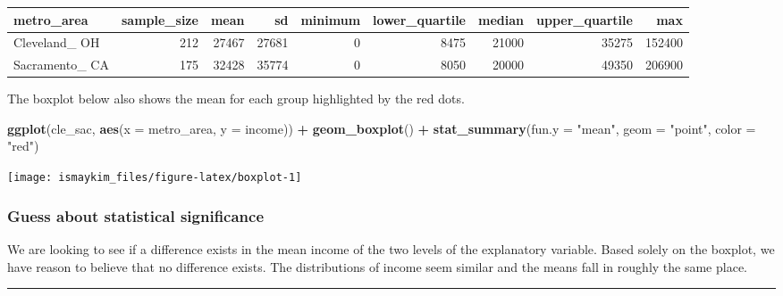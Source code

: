 \documentclass[12pt,]{krantz}
\makeatletter
\newenvironment{Shaded}{\begin{snugshade}}{\end{snugshade}}
\newcommand{\KeywordTok}[1]{\textcolor[rgb]{0.27,0.27,0.27}{\textbf{#1}}}
\newcommand{\DataTypeTok}[1]{\textcolor[rgb]{0.27,0.27,0.27}{#1}}
\newcommand{\StringTok}[1]{\textcolor[rgb]{0.5,0.5,0.5}{#1}}
\newcommand{\OperatorTok}[1]{\textcolor[rgb]{0.43,0.43,0.43}{\textbf{#1}}}
\newcommand{\NormalTok}[1]{#1}
\newenvironment{kframe}{%
\medskip{}
\setlength{\fboxsep}{.8em}
 \def\at@end@of@kframe{}%
 \ifinner\ifhmode%
  \def\at@end@of@kframe{\end{minipage}}%
  \begin{minipage}{\columnwidth}%
 \fi\fi%
 \def\FrameCommand##1{\hskip\@totalleftmargin \hskip-\fboxsep
 \colorbox{shadecolor}{##1}\hskip-\fboxsep
     \hskip-\linewidth \hskip-\@totalleftmargin \hskip\columnwidth}%
 \MakeFramed {\advance\hsize-\width
   \@totalleftmargin\z@ \linewidth\hsize
   \@setminipage}}%
 {\par\unskip\endMakeFramed%
 \at@end@of@kframe}
\renewenvironment{Shaded}{\begin{kframe}}{\end{kframe}}
\theoremstyle{definition}
\theoremstyle{definition}
\theoremstyle{definition}
\theoremstyle{remark}
\makeatother
\begin{document}
\begin{table}[H]
\centering\begingroup\fontsize{10}{12}\selectfont

\begin{tabular}{l|r|r|r|r|r|r|r|r}
\hline
metro\_area & sample\_size & mean & sd & minimum & lower\_quartile & median & upper\_quartile & max\\
\hline
Cleveland\_ OH & 212 & 27467 & 27681 & 0 & 8475 & 21000 & 35275 & 152400\\
\hline
Sacramento\_ CA & 175 & 32428 & 35774 & 0 & 8050 & 20000 & 49350 & 206900\\
\hline
\end{tabular}\endgroup{}
\end{table}

The boxplot below also shows the mean for each group highlighted by the
red dots.

\begin{Shaded}
\begin{Highlighting}[]
\KeywordTok{ggplot}\NormalTok{(cle_sac, }\KeywordTok{aes}\NormalTok{(}\DataTypeTok{x =}\NormalTok{ metro_area, }\DataTypeTok{y =}\NormalTok{ income)) }\OperatorTok{+}
\StringTok{  }\KeywordTok{geom_boxplot}\NormalTok{() }\OperatorTok{+}
\StringTok{  }\KeywordTok{stat_summary}\NormalTok{(}\DataTypeTok{fun.y =} \StringTok{"mean"}\NormalTok{, }\DataTypeTok{geom =} \StringTok{"point"}\NormalTok{, }\DataTypeTok{color =} \StringTok{"red"}\NormalTok{)}
\end{Highlighting}
\end{Shaded}

\begin{center}\texttt{[image: ismaykim\_files/figure-latex/boxplot-1]} \end{center}

\subsubsection*{Guess about statistical
significance}\label{guess-about-statistical-significance-3}

We are looking to see if a difference exists in the mean income of the
two levels of the explanatory variable. Based solely on the boxplot, we
have reason to believe that no difference exists. The distributions of
income seem similar and the means fall in roughly the same place.

\begin{center}\rule{0.5\linewidth}{\linethickness}\end{center}
\end{document}
